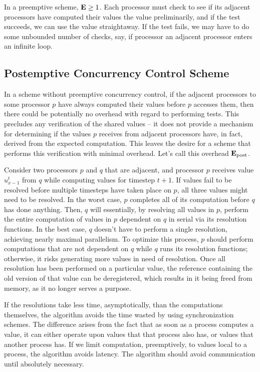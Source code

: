 In a preemptive scheme, $\mathbf{E} \geq 1$. Each processor must check to see if its
adjacent processors have computed their values the value preliminarily, and if
the test succeeds, we can use the value straightaway. If the test fails, we may
have to do some unbounded number of checks, say, if processor an adjacent
processor enters an infinite loop.

\subsection{Postemptive Concurrency Control Scheme}

In a scheme without preemptive concurrency control, if the adjacent processors
to some processor $p$ have always computed their values before $p$ accesses
them, then there could be potentially no overhead with regard to performing
tests. This precludes any verification of the shared values -- it does not
provide a mechanism for determining if the values $p$ receives from adjacent
processors have, in fact, derived from the expected computation. This leaves the
desire for a scheme that performs this verification with minimal overhead. Let's
call this overhead $\mathbf{E}_\text{post}$.

Consider two processors $p$ and $q$ that are adjacent, and processor $p$
receives value $u^{t}_{x-1}$ from $q$ while computing values for timestep $t+1$.
If values fail to be resolved before multiple timesteps have taken place on $p$,
all three values might need to be resolved. In the worst case, $p$ completes all
of its computation before $q$ has done anything. Then, $q$ will essentially, by
resolving all values in $p$, perform the entire computation of values in $p$
dependent on $q$ in serial via its resolution functions. In the best case, $q$
doesn't have to perform a single resolution, achieving nearly maximal
parallelism. To optimize this process, $p$ should perform computations that are
not dependent on $q$ while $q$ runs its resolution functions; otherwise, it
risks generating more values in need of resolution. Once all resolution has been
performed on a particular value, the reference containing the old version of
that value can be deregistered, which results in it being freed from memory, as
it no longer serves a purpose.

If the resolutions take less time, asymptotically, than the computations
themselves, the algorithm avoids the time wasted by using synchronization
schemes. The difference arises from the fact that as soon as a process computes
a value, it can either operate upon values that that process also has, or values
that another process has. If we limit computation, preemptively, to values local
to a process, the algorithm avoids latency. The algorithm should avoid
communication until absolutely necessary.

